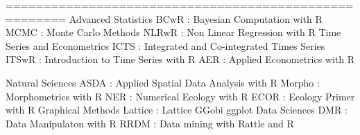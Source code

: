 

======================================================
Advanced Statistics
BCwR : Bayesian Computation with R
MCMC : Monte Carlo Methods
NLRwR : Non Linear Regression with R
Time Series and Econometrics
ICTS : Integrated and Co-integrated Times Series
ITSwR : Introduction to Time Series with R
AER : Applied Econometrics with R
 
Natural Sciences
ASDA : Applied Spatial Data Analysis with R
Morpho : Morphometrics with R
NER  : Numerical Ecology with R
ECOR : Ecology Primer with R
Graphical Methods
Lattice : Lattice
GGobi
ggplot
Data Sciences
DMR  : Data Manipulaton with R
RRDM : Data mining with Rattle and R
